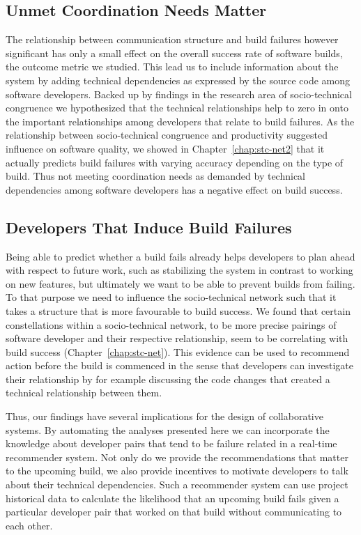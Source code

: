 \subsection{Unmet Coordination Needs Matter}
The relationship between communication structure and build failures however significant has only a small effect on the overall success rate of software builds, the outcome metric we studied.
This lead us to include information about the system by adding technical dependencies as expressed by the source code among software developers.
Backed up by findings in the research area of socio-technical congruence we hypothesized that the technical relationships help to zero in onto the important relationships among developers that relate to build failures.
As the relationship between socio-technical congruence and productivity suggested influence on software quality, we showed in Chapter~\ref{chap:stc-net2} that it actually predicts build failures with varying accuracy depending on the type of build.
Thus not meeting coordination needs as demanded by technical dependencies among software developers has a negative effect on build success.

\subsection{Developers That Induce Build Failures}
\label{sec:implications}
Being able to predict whether a build fails already helps developers to plan ahead with respect to future work, such as stabilizing the system in contrast to working on new features, but ultimately we want to be able to prevent builds from failing.
To that purpose we need to influence the socio-technical network such that it takes a structure that is more favourable to build success.
We found that certain constellations within a socio-technical network, to be more precise pairings of software developer and their respective relationship, seem to be correlating with build success (Chapter~\ref{chap:stc-net}).
This evidence can be used to recommend action before the build is commenced in the sense that developers can investigate their relationship by for example discussing the code changes that created a technical relationship between them.

Thus, our findings have several implications for the design of collaborative systems.
By automating the analyses presented here we can incorporate the knowledge about
developer pairs that tend to be failure related in a real-time recommender
system. Not only do we provide the recommendations that matter to the upcoming
build, we also provide incentives to motivate developers to talk about their
technical dependencies. 
Such a recommender system can use project historical data to
calculate the likelihood that an upcoming build fails given a particular
developer pair that worked on that build without communicating to each other.

